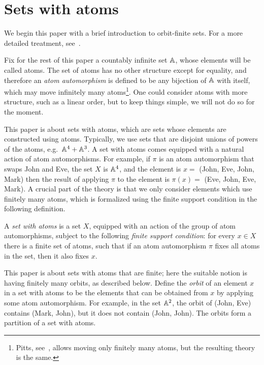 \section{Sets with atoms}
We begin this paper with  a brief introduction to orbit-finite sets. For a more detailed treatment, see~\cite{bojanczyk_slightly2018}.

Fix for the rest of this paper a countably infinite set $\mathbb A$, whose elements will be called atoms. The set of atoms has no other structure except for equality, and therefore an \emph{atom automorphism} is defined to be any bijection of $\mathbb A$ with itself, which may move infinitely many atoms\footnote{Pitts, see~\cite[Definition 1.13]{PittsAM:nomsns}, allows moving only finitely many atoms, but the resulting theory is the same.}. One could consider atoms with more structure, such as a linear order, but to keep things simple, we will not do so for the moment.

This paper is about sets with atoms, which are sets whose elements are constructed using atoms. Typically, we use sets that are disjoint unions of powers of the atoms, e.g.~$\mathbb A^4 + \mathbb A^3$. A set with atoms comes equipped with a natural action of atom automorphisms. For example, if $\pi$ is an atom automorphism that swaps John and Eve, the set $X$ is $\mathbb A^4$, and the element is  $x=$ (John, Eve, John, Mark) then the result of applying $\pi$ to the element is $\pi(x)=$ (Eve, John, Eve, Mark).  A crucial part of the theory is that we only consider elements which use finitely many atoms, which is formalized using the finite support condition in the following definition.

\begin{definition}
    A \emph{set with atoms} is a set $X$, equipped with an action of the group of atom automorphisms, subject to the following \emph{finite support condition}: for every $x \in X$ there is a finite set of atoms, such that if an atom automorphism $\pi$ fixes all atoms in the set, then it also fixes $x$.
\end{definition}
    
This paper is about sets with atoms that are finite; here the suitable notion is having finitely many orbits, as described below.
Define the \emph{orbit} of an element $x$ in a set with atoms to be the elements that can be obtained from $x$ by applying some atom automorphism. For example, in the set $\mathbb A^2$,  the orbit of (John, Eve)   contains  (Mark, John), but it does not contain (John, John). The orbits form a partition of a set with atoms. 


